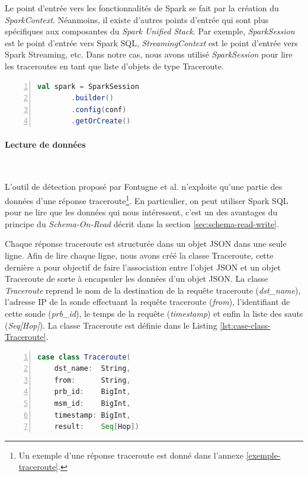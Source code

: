 Le point d'entrée vers les fonctionnalités de Spark se fait par la création du  \textit{SparkContext}. 
Néanmoins, il existe d'autres points d'entrée qui sont plus spécifiques aux composantes du \textit{Spark Unified Stack}. Par exemple,  \textit{SparkSession}  est le point d'entrée vers Spark SQL, \textit{StreamingContext} est le point d'entrée vers Spark Streaming, etc.
Dans notre cas, nous avons utilisé \textit{SparkSession} pour lire les traceroutes en tant que liste d'objets de type Traceroute.

\begin{lstlisting}[language=scala,firstnumber=1, caption={Creation d'une session Spark},label={lst:SparkSession-initiation}, basicstyle = \footnotesize,escapechar=|,numbers=left,
stepnumber=1]
val spark = SparkSession
		.builder()
		.config(conf)
		.getOrCreate()
\end{lstlisting}

\paragraph{Lecture de données}~

L'outil de détection proposé par  Fontugne et al. n'exploite qu'une partie des données d'une réponse traceroute\footnote{Un exemple d'une réponse  traceroute  est donné dans l'annexe \ref{exemple-traceroute}.}.
En particulier, on peut utiliser Spark SQL pour  ne lire que les données qui nous intéressent, c'est un des avantages du principe du \textit{Schema-On-Read} décrit dans la section \ref{sec:schema-read-write}. 

Chaque réponse traceroute est structurée dans un objet JSON dans une seule ligne. Afin de lire chaque ligne, nous avons créé la classe Traceroute, cette dernière  a pour objectif de faire l'association entre l'objet JSON  et un objet Traceroute de sorte à encapsuler les données d'un objet JSON. La classe \textit{Traceroute} reprend le nom de la destination de la requête traceroute (\textit{dst\_name}), l'adresse IP de la sonde effectuant la requête traceroute (\textit{from}), l'identifiant de cette sonde (\textit{prb\_id}), le temps de la requête (\textit{timestamp}) et enfin la liste des sauts (\textit{Seq[Hop]}). La classe Traceroute est définie dans le Listing \ref{lst:case-class-Traceroute}.


\begin{lstlisting}[language=scala,firstnumber=1, caption={Définition de la  classe Traceroute},label={lst:case-class-Traceroute}, basicstyle = \footnotesize,escapechar=|,numbers=left,
stepnumber=1]
case class Traceroute(
	dst_name:  String,
	from:      String,
	prb_id:    BigInt,
	msm_id:    BigInt,
	timestamp: BigInt,
	result:    Seq[Hop])
\end{lstlisting}


